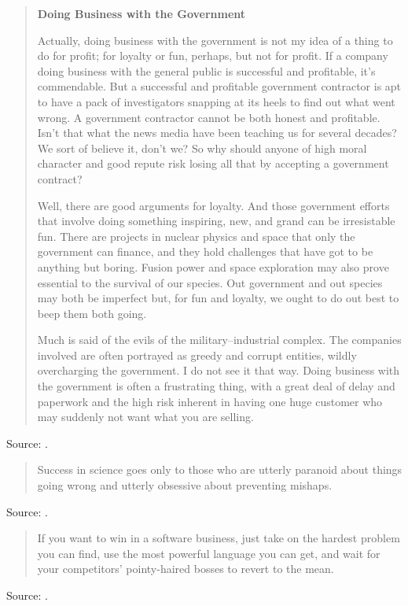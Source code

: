 \documentclass[a4paper]{article}
\begin{document}
\begin{quotation}
	\textbf{Doing Business with the Government}

	Actually, doing business with the government is not my idea of a thing to do for profit;
for loyalty or fun, perhaps, but not for profit.  If a company doing business with the general
public is successful and profitable, it's commendable.  But a successful and profitable government
contractor is apt to have a pack of investigators snapping at its heels to find out what went
wrong.  A government contractor cannot be both honest and profitable.  Isn't that what the news
media have been teaching us for several decades?  We sort of believe it, don't we?  So why should
anyone of high moral character and good repute risk losing all that by accepting a government
contract?

	Well, there are good arguments for loyalty.  And those government efforts that involve doing
something inspiring, new, and grand can be irresistable fun.  There are projects in nuclear physics
and space that only the government can finance, and they hold challenges that have got to be
anything but boring.  Fusion power and space exploration may also prove essential to the survival
of our species.  Out government and out species may both be imperfect but, for fun and loyalty, we
ought to do out best to beep them both going.

	Much is said of the evils of the military--industrial complex.  The companies involved are
often portrayed as greedy and corrupt entities, wildly overcharging the government.  I do not see
it that way.  Doing business with the government is often a frustrating thing, with a great deal of
delay and paperwork and the high risk inherent in having one huge customer who may suddenly not
want what you are selling.
\end{quotation}
Source: \citet[pp.~201--202]{Dequasie1991}.
\medskip

\begin{quote}
	Success in science goes only to those who are utterly paranoid
	about things going wrong and utterly obsessive about preventing
	mishaps.
\end{quote}
Source: \citep[p.~6]{Slack1998}.
\medskip

\begin{quote}
	If you want to win in a software business, just take on the
	hardest problem you can find, use the most powerful language you
	can get, and wait for your competitors' pointy-haired bosses to
	revert to the mean.
\end{quote}
Source: \citet{Graham2004}.
\medskip
\end{document}

